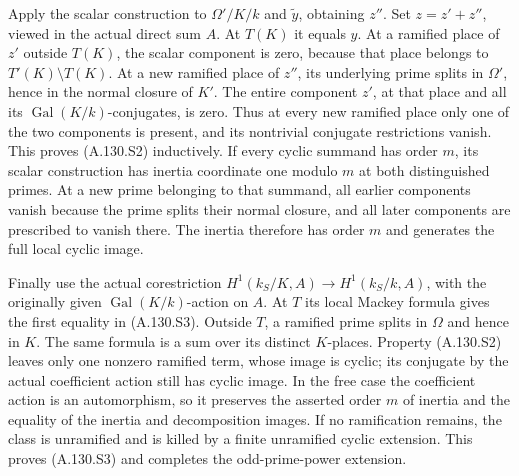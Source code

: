 Apply the scalar construction to \(\Omega'/K/k\) and
\(\widetilde y\), obtaining \(z''\).
Set \(z=z'+z''\), viewed in the actual direct sum \(A\).
At \(T(K)\) it equals \(y\).
At a ramified place of \(z'\) outside \(T(K)\), the scalar
component is zero, because that place belongs to
\(T'(K)\setminus T(K)\).
At a new ramified place of \(z''\), its underlying prime
splits in \(\Omega'\), hence in the normal closure of \(K'\).
The entire component \(z'\), at that place and all its
\(\operatorname{Gal}(K/k)\)-conjugates, is zero.
Thus at every new ramified place only one of the two
components is present, and its nontrivial conjugate
restrictions vanish.  This proves (A.130.S2) inductively.
If every cyclic summand has order \(m\), its scalar
construction has inertia coordinate one modulo \(m\)
at both distinguished primes.  At a new prime belonging
to that summand, all earlier components vanish because
the prime splits their normal closure, and all later
components are prescribed to vanish there.  The inertia
therefore has order \(m\) and generates the full local
cyclic image.

Finally use the actual corestriction
\(H^1(k_S/K,A)\to H^1(k_S/k,A)\), with the originally
given \(\operatorname{Gal}(K/k)\)-action on \(A\).
At \(T\) its local Mackey formula gives the first equality
in (A.130.S3).
Outside \(T\), a ramified prime splits in \(\Omega\) and
hence in \(K\).  The same formula is a sum over its
distinct \(K\)-places.  Property (A.130.S2) leaves only
one nonzero ramified term, whose image is cyclic; its
conjugate by the actual coefficient action still has
cyclic image.  In the free case the coefficient action
is an automorphism, so it preserves the asserted order
\(m\) of inertia and the equality of the inertia and
decomposition images.  If no ramification remains, the class is
unramified and is killed by a finite unramified cyclic
extension.  This proves (A.130.S3) and completes the
odd-prime-power extension.

